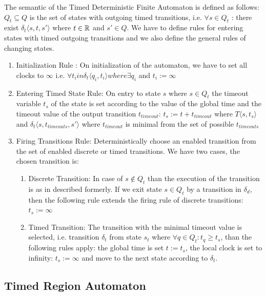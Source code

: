 			The semantic of the Timed Deterministic Finite Automaton is defined as follows:
			$Q_t \subseteq Q$ is the set of states with outgoing timed transitions, 
			i.e. $\forall s \in Q_t$ : there exist $ \delta_t\langle s, t, s' \rangle$ where $t \in \mathbb{R}$ and $s' \in Q$.
			We have to define rules for entering states with timed outgoing transitions and we also define the general rules of changing states. 
			\begin{enumerate}
				\item Initialization Rule : On initialization of the automaton, we have to set all clocks to $\infty$ 
				i.e. $\forall t_i in \delta_t \langle q_i, t_i \rangle where \exists q_i$ and $t_i := \infty $
			
				\item Entering Timed State Rule: On entry to state $s$ where $s \in Q_t$ the timeout variable $t_s$ of the state is set according to the value of the global time and the timeout value of the output transition $t_{timeout}$:
					$t_s:= t+t_{timeout}$ %
					where $T\langle s,t_s \rangle$ and $\delta_t\langle s,t_{timeouts},s' \rangle$ where $t_{timeout}$ is minimal from the set of possible $t_{timeouts}$ 
				
				\item Firing Transitions Rule: Deterministically choose an enabled transition from the set of enabled discrete or timed transitions. We have two cases, the chosen transition is:
					\begin{enumerate}
						\item Discrete Transition: In case of $s \notin Q_t$ than the execution of the transition is as in described formerly. If we exit state $s \in Q_t$ by a transition in $\delta_d$, 
						then the following rule extends the firing rule of discrete transitions:
							$t_s := \infty$
						\item Timed Transition: The transition with the minimal timeout value is selected, i.e. transition $\delta_t$ from state $s_t$ where $\forall q \in Q_t: t_q \geq t_s$, than the following rules apply:
						 the global time is set $t := t_s$, the local clock is set to infinity: $t_s := \infty$ and move to the next state according to $\delta_t$.
					\end{enumerate}			
			\end{enumerate}
		
		\subsection{Timed Region Automaton}
	

